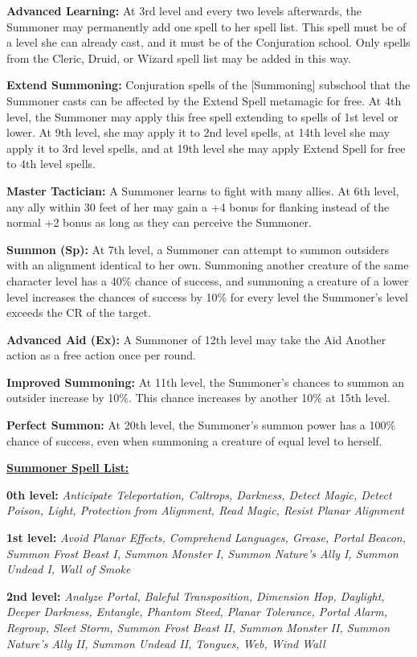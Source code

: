 \documentclass[10pt]{article}
\newcommand{\ability}[2]{\smallskip \noindent \textbf{#1} #2}
\newcommand{\spelllist}[1]{\smallskip \noindent \underline{\large \textbf{#1}}}
\begin{document}
\ability{Advanced Learning:}{At 3rd level and every two levels afterwards, the Summoner may permanently add one spell to her spell list. This spell must be of a level she can already cast, and it must be of the Conjuration school. Only spells from the Cleric, Druid, or Wizard spell list may be added in this way.}

\ability{Extend Summoning:}{Conjuration spells of the [Summoning] subschool that the Summoner casts can be affected by the Extend Spell metamagic for free. At 4th level, the Summoner may apply this free spell extending to spells of 1st level or lower. At 9th level, she may apply it to 2nd level spells, at 14th level she may apply it to 3rd level spells, and at 19th level she may apply Extend Spell for free to 4th level spells.}

\ability{Master Tactician:}{A Summoner learns to fight with many allies. At 6th level, any ally within 30 feet of her may gain a +4 bonus for flanking instead of the normal +2 bonus as long as they can perceive the Summoner.}

\ability{Summon (Sp):}{At 7th level, a Summoner can attempt to summon outsiders with an alignment identical to her own. Summoning another creature of the same character level has a 40\% chance of success, and summoning a creature of a lower level increases the chances of success by 10\% for every level the Summoner's level exceeds the CR of the target.}

\ability{Advanced Aid (Ex):}{A Summoner of 12th level may take the Aid Another action as a free action once per round.}

\ability{Improved Summoning:}{At 11th level, the Summoner's chances to summon an outsider increase by 10\%. This chance increases by another 10\% at 15th level.}

\ability{Perfect Summon:}{At 20th level, the Summoner's summon power has a 100\% chance of success, even when summoning a creature of equal level to herself.}


\spelllist{Summoner Spell List:}

\ability{0th level:}{\emph{Anticipate Teleportation, Caltrops, Darkness, Detect Magic, Detect Poison, Light, Protection from Alignment, Read Magic, Resist Planar Alignment}}

\ability{1st level:}{\emph{Avoid Planar Effects, Comprehend Languages, Grease, Portal Beacon, Summon Frost Beast I, Summon Monster I, Summon Nature's Ally I, Summon Undead I, Wall of Smoke}}

\ability{2nd level:}{\emph{Analyze Portal, Baleful Transposition, Dimension Hop, Daylight, Deeper Darkness, Entangle, Phantom Steed, Planar Tolerance, Portal Alarm, Regroup, Sleet Storm, Summon Frost Beast II, Summon Monster II, Summon Nature's Ally II, Summon Undead II, Tongues, Web, Wind Wall}}
\end{document}
